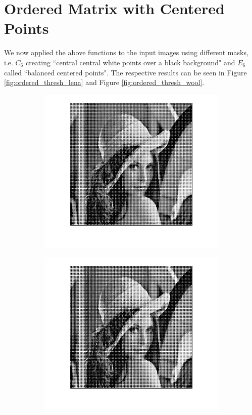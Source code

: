 \documentclass{article}
\begin{document}
\section{Ordered Matrix with Centered Points}
We now applied the above functions to the input images using different masks, i.e. $C_6$ creating ``central central white points over a black background" and $E_6$ called ``balanced centered points". The respective results can be seen in Figure \ref{fig:ordered_thresh_lena} and Figure \ref{fig:ordered_thresh_wool}. 
 \begin{figure}
        \centering
        \begin{subfigure}[b]{0.49\textwidth}
            \includegraphics[width=\textwidth]{Images/lena_ordered_c6.png}
        \end{subfigure}
        \begin{subfigure}[b]{0.49\textwidth}
            \includegraphics[width=\textwidth]{Images/lena_ordered_e6.png}

\end{subfigure}
\end{figure}
\end{document}
